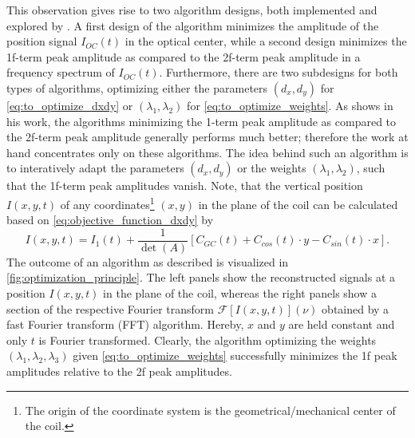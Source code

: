 \documentclass{report}
\numberwithin{tm}{section}
\begin{document}
This observation gives rise to two algorithm designs, both implemented and explored by \cite{Glardon.2024}. A first design of the algorithm minimizes the amplitude of the position signal $I_{OC}(t)$ in the optical center, while a second design minimizes the 1f-term peak amplitude as compared to the 2f-term peak amplitude in a frequency spectrum of $I_{OC}(t)$. Furthermore, there are two subdesigns for both types of algorithms, optimizing either the parameters $(d_x, d_y)$ for \cref{eq:to_optimize_dxdy} or $(\lambda_1,\lambda_2)$ for \cref{eq:to_optimize_weights}. As \cite{Glardon.2024} shows in his work, the algorithms minimizing the 1-term peak amplitude as compared to the 2f-term peak amplitude generally performs much better; therefore the work at hand concentrates only on these algorithms. The idea behind such an algorithm is to interatively adapt the parameters $(d_x, d_y)$ or the weights $(\lambda_1, \lambda_2)$, such that the 1f-term peak amplitudes vanish. Note, that the vertical position $I(x,y,t)$ of any coordinates\footnote{The origin of the coordinate system is the geometrical/mechanical center of the coil.} $(x,y)$ in the plane of the coil can be calculated based on \cref{eq:objective_function_dxdy} by \begin{equation}
	I(x,y,t) = I_1(t) + \frac{1}{\det(A)}[C_{GC}(t) + C_{cos}(t)\cdot y - C_{sin}(t)\cdot x]. 
\end{equation} The outcome of an algorithm as described is visualized in \cref{fig:optimization_principle}. The left panels show the reconstructed signals at a position $I(x,y,t)$ in the plane of the coil, whereas the right panels show a section of the respective Fourier transform $\mathcal{F}[I(x,y,t)](\nu)$ obtained by a fast Fourier transform (FFT) algorithm. Hereby, $x$ and $y$ are held constant and only $t$ is Fourier transformed. Clearly, the algorithm optimizing the weights $(\lambda_1, \lambda_2, \lambda_3)$ given \cref{eq:to_optimize_weights} successfully minimizes the 1f peak amplitudes relative to the 2f peak amplitudes.
\end{document}
